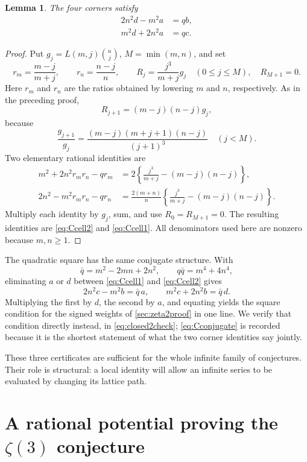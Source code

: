 \documentclass[11pt,letterpaper]{article}
\numberwithin{equation}{section}
\newtheorem{lemma}[theorem]{Lemma}
\theoremstyle{definition}
\begin{document}
\begin{lemma}\label{lem:Ccell}
The four corners satisfy
\begin{align}
 2n^2d-m^2a&=q b,\label{eq:Ccell1}\\
 m^2d+2n^2a&=q c.\label{eq:Ccell2}
\end{align}
\end{lemma}
\begin{proof}
Put $g_j=L(m,j)\binom nj$, $M=\min(m,n)$, and set
\[
 r_m=\frac{m-j}{m+j},\qquad r_n=\frac{n-j}{n},\qquad
 R_j=\frac{j^3}{m+j}g_j\quad(0\leq j\leq M),\quad R_{M+1}=0.
\]
Here $r_m$ and $r_n$ are the ratios obtained by lowering $m$ and $n$,
respectively. As in the preceding proof,
\[
 R_{j+1}=(m-j)(n-j)g_j,
\]
because
\[
 \frac{g_{j+1}}{g_j}
 =\frac{(m-j)(m+j+1)(n-j)}{(j+1)^3}
 \quad(j<M).
\]
Two elementary rational identities are
\begin{align}
 m^2+2n^2r_mr_n-q r_m
 &=2\left\{\frac{j^3}{m+j}-(m-j)(n-j)\right\},\label{eq:Ccert2}\\
 2n^2-m^2r_mr_n-q r_n
 &=\frac{2(m+n)}{n}
 \left\{\frac{j^3}{m+j}-(m-j)(n-j)\right\}.\label{eq:Ccert1}
\end{align}
Multiply each identity by $g_j$, sum, and use $R_0=R_{M+1}=0$.
The resulting identities are \eqref{eq:Ccell2} and \eqref{eq:Ccell1}.
All denominators used here are nonzero because $m,n\geq1$.
\end{proof}

The quadratic square has the same conjugate structure. With
\begin{equation}\label{eq:qbar}
 \bar q=m^2-2mn+2n^2,\qquad q\bar q=m^4+4n^4,
\end{equation}
eliminating $a$ or $d$ between \eqref{eq:Ccell1} and \eqref{eq:Ccell2}
gives
\begin{equation}\label{eq:Cconjugate}
 2n^2c-m^2b=\bar q\,a,\qquad m^2c+2n^2b=\bar q\,d.
\end{equation}
Multiplying the first by $d$, the second by $a$, and equating yields the
square condition for the signed weights of \cref{sec:zeta2proof} in one
line. We verify that condition directly instead, in \eqref{eq:closed2check};
\eqref{eq:Cconjugate} is recorded because it is the shortest statement of
what the two corner identities say jointly.

These three certificates are sufficient for the whole infinite family
of conjectures. Their role is structural: a local identity will allow
an infinite series to be evaluated by changing its lattice path.

\section{A rational potential proving the \texorpdfstring{$\zeta(3)$}{zeta(3)} conjecture}\label{sec:zeta3proof}
\end{document}
